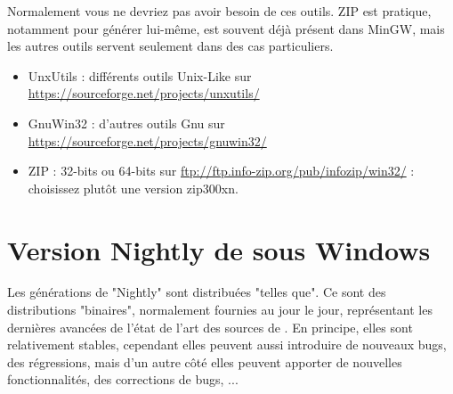 Normalement vous ne devriez pas avoir besoin de ces outils. ZIP est pratique, notamment pour générer \codeblocks lui-même, est souvent déjà présent dans MinGW, mais les autres outils servent seulement dans des cas particuliers.
\begin{itemize}
\item UnxUtils : différents outils Unix-Like sur \url{https://sourceforge.net/projects/unxutils/}
\item GnuWin32 : d'autres outils Gnu sur \url{https://sourceforge.net/projects/gnuwin32/}
\item ZIP : 32-bits ou 64-bits sur \url{ftp://ftp.info-zip.org/pub/infozip/win32/} : choisissez plutôt une version zip300xn.
\end{itemize}

\section{Version Nightly de \codeblocks sous Windows}

Les générations de "Nightly" sont distribuées "telles que". Ce sont des distributions "binaires", normalement fournies au jour le jour, représentant les dernières avancées de l'état de l'art des sources de \codeblocks. En principe, elles sont relativement stables, cependant elles peuvent aussi introduire de nouveaux bugs, des régressions, mais d'un autre côté elles peuvent apporter de nouvelles fonctionnalités, des corrections de bugs, ...

